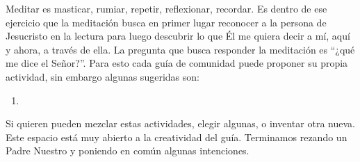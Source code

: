 Meditar es masticar, rumiar, repetir, reflexionar, recordar. Es dentro de ese ejercicio que la meditación busca en primer lugar reconocer a la persona de Jesucristo en la lectura para luego descubrir lo que Él me quiera decir a mí, aquí y ahora, a través de ella. La pregunta que busca responder la meditación es “¿qué me dice el Señor?”. Para esto cada guía de comunidad puede proponer su propia actividad, sin embargo algunas sugeridas son:

\begin{enumerate}
    \item 
\end{enumerate}

Si quieren pueden mezclar estas actividades, elegir algunas, o inventar otra nueva. Este espacio está muy abierto a la creatividad del guía.  
Terminamos rezando un Padre Nuestro y poniendo en común algunas intenciones.